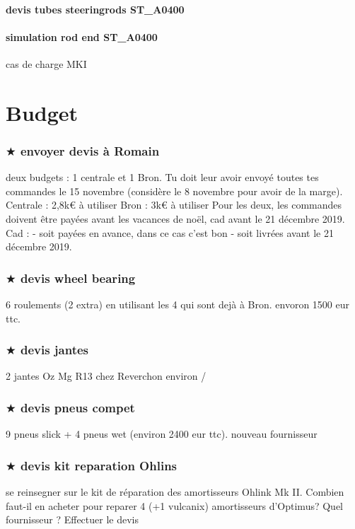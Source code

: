 			\paragraph{devis tubes steeringrods ST\_A0400} 
			\paragraph{simulation rod end ST\_A0400} cas de charge MKI
\newpage 
 \section*{Budget} 
 \par 
		\subsubsection*{$\bigstar$ envoyer devis à Romain} 
 \par deux budgets : 1 centrale et 1 Bron. Tu doit leur avoir envoyé toutes tes commandes le 15 novembre (considère le 8 novembre pour avoir de la marge).
Centrale : 2,8k€ à utiliser
Bron : 3k€ à utiliser
Pour les deux, les commandes doivent être payées avant les vacances de noël, cad avant le 21 décembre 2019.
Cad :
- soit payées en avance, dans ce cas c'est bon
- soit livrées avant le 21 décembre 2019.
		\subsubsection*{$\bigstar$ devis wheel bearing} 
 \par  6 roulements (2 extra) en utilisant les 4 qui sont dejà à Bron. envoron 1500 eur ttc. 
		\subsubsection*{$\bigstar$ devis jantes} 
 \par 2 jantes Oz Mg R13 chez Reverchon environ /%
		\subsubsection*{$\bigstar$ devis pneus compet} 
 \par 9 pneus slick + 4 pneus wet (environ 2400 eur ttc). nouveau fournisseur
		\subsubsection*{$\bigstar$ devis kit reparation Ohlins} 
 \par se reinsegner sur le kit de réparation des amortisseurs Ohlink Mk II. Combien faut-il en acheter pour reparer 4 (+1 vulcanix) amortisseurs d'Optimus? Quel fournisseur ? Effectuer le devis 
